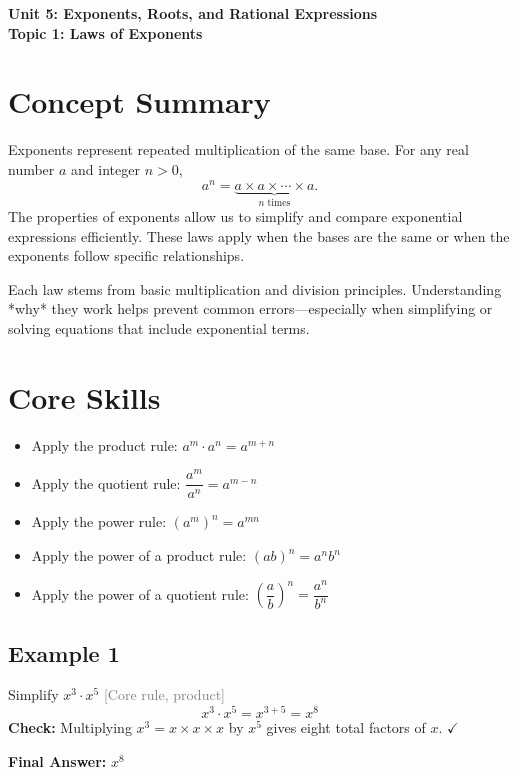 \documentclass[12pt]{article}
\newcommand{\UnitTitle}{Unit 5: Exponents, Roots, and Rational Expressions}
\newcommand{\TopicTitle}{Topic 1: Laws of Exponents}
\newcommand{\qtag}[1]{\textcolor{gray}{\footnotesize [#1]}}
\newenvironment{Example}[1]{%
  \subsection*{Example #1}%
}{\vspace{0.25em}}
\begin{document}
\begin{center}
  \LARGE \textbf{\UnitTitle}\\[6pt]
  \Large \textbf{\TopicTitle}\\[4pt]
\end{center}

\vspace{0.75em}

\section*{Concept Summary}
Exponents represent repeated multiplication of the same base. For any real number \(a\) and integer \(n > 0\),
\[
a^n = \underbrace{a \times a \times \cdots \times a}_{n \text{ times}}.
\]
The properties of exponents allow us to simplify and compare exponential expressions efficiently. These laws apply when the bases are the same or when the exponents follow specific relationships.

Each law stems from basic multiplication and division principles. Understanding *why* they work helps prevent common errors—especially when simplifying or solving equations that include exponential terms.

\section*{Core Skills}
\begin{itemize}
  \item Apply the product rule: \(a^m \cdot a^n = a^{m+n}\)
  \item Apply the quotient rule: \(\dfrac{a^m}{a^n} = a^{m-n}\)
  \item Apply the power rule: \((a^m)^n = a^{mn}\)
  \item Apply the power of a product rule: \((ab)^n = a^n b^n\)
  \item Apply the power of a quotient rule: \(\left(\dfrac{a}{b}\right)^n = \dfrac{a^n}{b^n}\)
\end{itemize}

\begin{Example}{1}
Simplify \(x^3 \cdot x^5\) \qtag{Core rule, product}
\[
x^3 \cdot x^5 = x^{3+5} = x^8
\]
\textbf{Check:} Multiplying \(x^3 = x \times x \times x\) by \(x^5\) gives eight total factors of \(x\). \(\checkmark\)

\textbf{Final Answer:} \(\boxed{x^8}\)
\end{Example}
\end{document}
